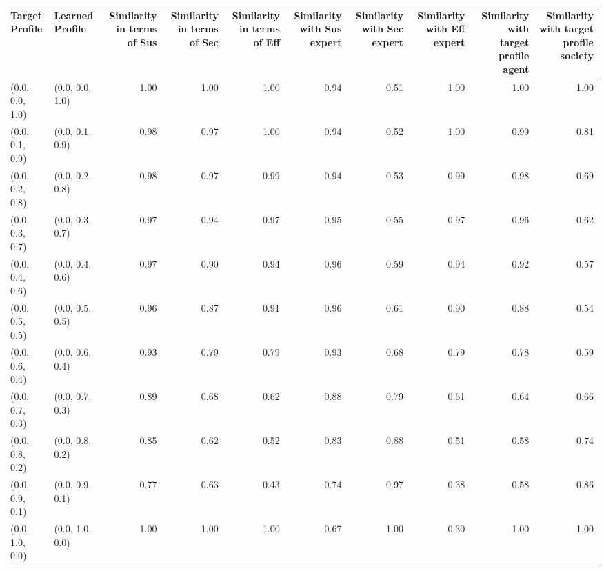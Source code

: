 \begin{tabular}{llrrrrrrrr}
\toprule
Target Profile & Learned Profile & Similarity in terms of Sus & Similarity in terms of Sec & Similarity in terms of Eff & Similarity with Sus expert & Similarity with Sec expert & Similarity with Eff expert & Similarity with target profile agent & Similarity with target profile society \\
\midrule
(0.0, 0.0, 1.0) & (0.0, 0.0, 1.0) & 1.00 & 1.00 & 1.00 & 0.94 & 0.51 & 1.00 & 1.00 & 1.00 \\
(0.0, 0.1, 0.9) & (0.0, 0.1, 0.9) & 0.98 & 0.97 & 1.00 & 0.94 & 0.52 & 1.00 & 0.99 & 0.81 \\
(0.0, 0.2, 0.8) & (0.0, 0.2, 0.8) & 0.98 & 0.97 & 0.99 & 0.94 & 0.53 & 0.99 & 0.98 & 0.69 \\
(0.0, 0.3, 0.7) & (0.0, 0.3, 0.7) & 0.97 & 0.94 & 0.97 & 0.95 & 0.55 & 0.97 & 0.96 & 0.62 \\
(0.0, 0.4, 0.6) & (0.0, 0.4, 0.6) & 0.97 & 0.90 & 0.94 & 0.96 & 0.59 & 0.94 & 0.92 & 0.57 \\
(0.0, 0.5, 0.5) & (0.0, 0.5, 0.5) & 0.96 & 0.87 & 0.91 & 0.96 & 0.61 & 0.90 & 0.88 & 0.54 \\
(0.0, 0.6, 0.4) & (0.0, 0.6, 0.4) & 0.93 & 0.79 & 0.79 & 0.93 & 0.68 & 0.79 & 0.78 & 0.59 \\
(0.0, 0.7, 0.3) & (0.0, 0.7, 0.3) & 0.89 & 0.68 & 0.62 & 0.88 & 0.79 & 0.61 & 0.64 & 0.66 \\
(0.0, 0.8, 0.2) & (0.0, 0.8, 0.2) & 0.85 & 0.62 & 0.52 & 0.83 & 0.88 & 0.51 & 0.58 & 0.74 \\
(0.0, 0.9, 0.1) & (0.0, 0.9, 0.1) & 0.77 & 0.63 & 0.43 & 0.74 & 0.97 & 0.38 & 0.58 & 0.86 \\
(0.0, 1.0, 0.0) & (0.0, 1.0, 0.0) & 1.00 & 1.00 & 1.00 & 0.67 & 1.00 & 0.30 & 1.00 & 1.00 \\
\bottomrule
\end{tabular}
